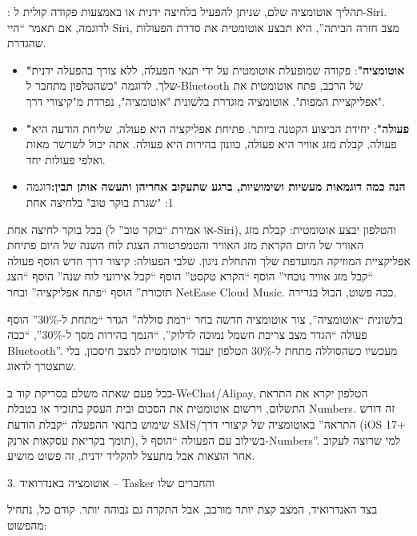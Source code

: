 : תהליך אוטומציה שלם, שניתן להפעיל בלחיצה ידנית או באמצעות פקודה קולית ל-Siri. לדוגמה, אם תאמר “היי Siri, מצב חזרה הביתה”, היא תבצע אוטומטית את סדרת הפעולות שהגדרת.

\begin{itemize}
  \item \textbf{"אוטומציה"}: פקודה שמופעלת אוטומטית על ידי תנאי הפעלה, ללא צורך בהפעלה ידנית שלך. לדוגמה "כשהטלפון מתחבר ל-Bluetooth של הרכב, פתח אוטומטית את אפליקציית המפות". אוטומציה מוגדרת בלשונית "אוטומציה", נפרדת מ"קיצורי דרך".
  \item \textbf{"פעולה"}: יחידת הביצוע הקטנה ביותר. פתיחת אפליקציה היא פעולה, שליחת הודעה היא פעולה, קבלת מזג אוויר היא פעולה, כוונון בהירות היא פעולה. אתה יכול לשרשר מאות ואלפי פעולות יחד.
  \item \textbf{הנה כמה דוגמאות מעשיות ושימושיות, ברגע שתעקוב אחריהן ותעשה אותן תבין:}דוגמה 1: "שגרת בוקר טוב" בלחיצה אחת
\end{itemize}

בכל בוקר לחיצה אחת (או אמירת “בוקר טוב” ל-Siri), והטלפון יבצע אוטומטית: קבלת מזג האוויר של היום הקראת מזג האוויר והטמפרטורה הצגת לוח השנה של היום פתיחת אפליקציית המוזיקה המועדפת שלך והתחלת ניגון. שלבי הפעולה: קיצור דרך חדש הוסף פעולה “קבל מזג אוויר נוכחי” הוסף “הקרא טקסט” הוסף “קבל אירועי לוח שנה” הוסף “הצג תזכורת” הוסף “פתח אפליקציה” ובחר NetEase Cloud Music. ככה פשוט, הכול בגרירה.


בלשונית “אוטומציה”, צור אוטומציה חדשה בחר “רמת סוללה” הגדר “מתחת ל-30\%” הוסף פעולה “הגדר מצב צריכת חשמל נמוכה לדלוק”, “הנמך בהירות מסך ל-30\%”, “כבה Bluetooth”. מעכשיו כשהסוללה מתחת ל-30\% הטלפון יעבור אוטומטית למצב חיסכון, בלי שתצטרך לדאוג.


בכל פעם שאתה משלם בסריקת קוד ב-WeChat/Alipay, הטלפון יקרא את התראת התשלום, וירשום אוטומטית את הסכום ובית העסק בתזכיר או בטבלת Numbers. זה דורש שימוש בתנאי ההפעלה “קבלת הודעת SMS/התראה” באוטומציה של קיצורי דרך (iOS 17+ תומך בקריאת עסקאות ארנק), בשילוב עם הפעולה “הוסף ל-Numbers”. למי שרוצה לעקוב אחר הוצאות אבל מתעצל להקליד ידנית, זה פשוט מושיע.


3. אוטומציה באנדרואיד – Tasker והחברים שלו

בצד האנדרואיד, המצב קצת יותר מורכב, אבל התקרה גם גבוהה יותר. קודם כל, נתחיל מהפשוט:


